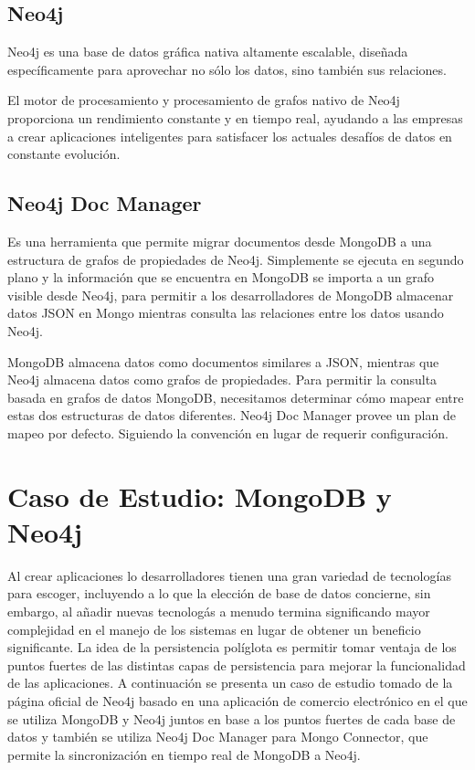 \documentclass[conference]{IEEEtran}
\begin{document}
\subsection{Neo4j}
Neo4j es una base de datos gr\'afica nativa altamente escalable, diseñada espec\'ificamente para aprovechar no s\'olo los datos, sino tambi\'en sus relaciones.

El motor de procesamiento y procesamiento de grafos nativo de Neo4j proporciona un rendimiento constante y en tiempo real, ayudando a las empresas a crear aplicaciones inteligentes para satisfacer los actuales desafíos de datos en constante evolución.\cite{neo}

\subsection{Neo4j Doc Manager}
Es una herramienta que permite migrar documentos desde MongoDB a una estructura de grafos de propiedades de Neo4j. Simplemente se ejecuta en segundo plano y la informaci\'on que se encuentra en MongoDB se importa a un grafo visible desde Neo4j, para permitir a los desarrolladores de MongoDB almacenar datos JSON en Mongo mientras consulta las relaciones entre los datos usando Neo4j.

MongoDB almacena datos como documentos similares a JSON, mientras que Neo4j almacena datos como grafos de propiedades. Para permitir la consulta basada en grafos de datos MongoDB, necesitamos determinar c\'omo mapear entre estas dos estructuras de datos diferentes. Neo4j Doc Manager provee un plan de mapeo por defecto. Siguiendo la convenci\'on en lugar de requerir configuraci\'on.\cite{doc}

\section{Caso de Estudio: MongoDB y Neo4j}
Al crear aplicaciones lo desarrolladores tienen una gran variedad de tecnolog\'ias para escoger, incluyendo a lo que la elecci\'on de base de datos  concierne, sin embargo, al a\~nadir nuevas tecnolog\'as a menudo termina significando mayor complejidad en el manejo de los sistemas en lugar de obtener un beneficio significante. La idea de la persistencia pol\'iglota es permitir tomar ventaja de los puntos fuertes de las distintas capas de persistencia para mejorar la funcionalidad de las aplicaciones. A continuaci\'on se presenta un caso de estudio tomado de la p\'agina oficial de Neo4j \cite{caso} basado en una aplicaci\'on de comercio electr\'onico en el que se utiliza MongoDB y Neo4j juntos en base a los puntos fuertes de cada base de datos y tambi\'en se utiliza Neo4j Doc Manager para Mongo Connector, que permite la sincronizaci\'on en tiempo real de MongoDB a Neo4j.
\end{document}

